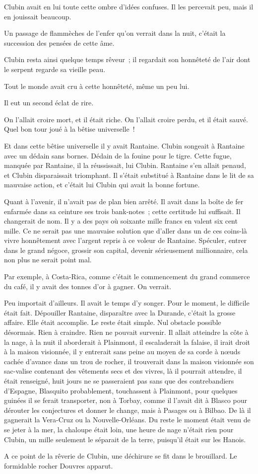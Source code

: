 \documentclass[french,twoside]{book} %
\begin{document}
Clubin avait en lui toute cette ombre d’idées confuses. Il les percevait peu, mais il en jouissait beaucoup.\par
Un passage de flammèches de l’enfer qu’on verrait dans la nuit, c’était la succession des pensées de cette âme.\par
Clubin resta ainsi quelque temps rêveur ; il regardait son honnêteté de l’air dont le serpent regarde sa vieille peau.\par
Tout le monde avait cru à cette honnêteté, même un peu lui.\par
Il eut un second éclat de rire.\par
On l’allait croire mort, et il était riche. On l’allait croire perdu, et il était sauvé. Quel bon tour joué à la bêtise universelle !\par
Et dans cette bêtise universelle il y avait Rantaine. Clubin songeait à Rantaine avec un dédain sans bornes. Dédain de la fouine pour le tigre. Cette fugue, manquée par Rantaine, il la réussissait, lui Clubin. Rantaine  s’en allait penaud, et Clubin disparaissait triomphant. Il s’était substitué à Rantaine dans le lit de sa mauvaise action, et c’était lui Clubin qui avait la bonne fortune.\par
Quant à l’avenir, il n’avait pas de plan bien arrêté. Il avait dans la boîte de fer enfarmée dans sa ceinture ses trois bank-notes ; cette certitude lui suffisait. Il changerait de nom. Il y a des pays où soixante mille francs en valent six cent mille. Ce ne serait pas une mauvaise solution que d’aller dans un de ces coins-là vivre honnêtement avec l’argent repris à ce voleur de Rantaine. Spéculer, entrer dans le grand négoce, grossir son capital, devenir sérieusement millionnaire, cela non plus ne serait point mal.\par
Par exemple, à Costa-Rica, comme c’était le commencement du grand commerce du café, il y avait des tonnes d’or à gagner. On verrait.\par
Peu importait d’ailleurs. Il avait le temps d’y songer. Pour le moment, le difficile était fait. Dépouiller Rantaine, disparaître avec la Durande, c’était la grosse affaire. Elle était accomplie. Le reste était simple. Nul obstacle possible désormais. Rien à craindre. Rien ne pouvait survenir. Il allait atteindre la côte à la nage, à la nuit il aborderait à Plainmont, il escaladerait la falaise, il irait droit à la maison visionnée, il y entrerait sans peine au moyen de sa corde à nœuds cachée d’avance dans un trou de rocher, il trouverait dans la maison visionnée son sac-valise contenant des vêtements secs et des vivres, là il pourrait attendre, il était renseigné, huit jours ne se passeraient pas sans  que des contrebandiers d’Espagne, Blasquito probablement, touchassent à Plainmont, pour quelques guinées il se ferait transporter, non à Torbay, comme il l’avait dit à Blasco pour dérouter les conjectures et donner le change, mais à Pasages ou à Bilbao. De là il gagnerait la Vera-Cruz ou la Nouvelle-Orléans. Du reste le moment était venu de se jeter à la mer, la chaloupe était loin, une heure de nage n’était rien pour Clubin, un mille seulement le séparait de la terre, puisqu’il était sur les Hanois.\par
A ce point de la rêverie de Clubin, une déchirure se fit dans le brouillard. Le formidable rocher Douvres apparut.
\end{document}
